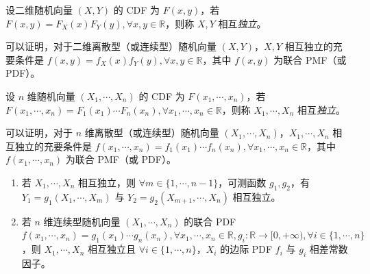 \documentclass[../main.tex]{subfiles}
\begin{document}
\begin{definition}\label{def:3.6.1}
    设二维随机向量 $(X,Y)$ 的 CDF 为 $F(x,y)$，若 $F(x,y)=F_X(x)F_Y(y),\forall x,y\in\mathbb R$，则称 $X,Y$ 相互\emph{独立}。
\end{definition}

可以证明，对于二维离散型（或连续型）随机向量 $(X,Y)$，$X,Y$ 相互独立的充要条件是 $f(x,y)=f_X(x)f_Y(y),\forall x,y\in\mathbb R$，其中 $f(x,y)$ 为联合 PMF（或 PDF）。

\begin{definition}\label{def:3.6.2}
    设 $n$ 维随机向量 $(X_1,\cdots,X_n)$ 的 CDF 为 $F(x_1,\cdots,x_n)$，若 $F(x_1,\cdots,x_n)=F_{1}(x_1)\cdots F_n(x_n),\forall x_1,\cdots,x_n\in\mathbb R$，则称 $X_1,\cdots,X_n$ 相互\emph{独立}。
\end{definition}

可以证明，对于 $n$ 维离散型（或连续型）随机向量 $(X_1,\cdots,X_n)$，$X_1,\cdots,X_n$ 相互独立的充要条件是 $f(x_1,\cdots,x_n)=f_1(x_1)\cdots f_n(x_n),\forall x_1,\cdots,x_n\in\mathbb R$，其中 $f(x_1,\cdots,x_n)$ 为联合 PMF（或 PDF）。

\begin{theorem}\label{thm:3.6.1}
    \begin{enumerate}
        \item 若 $X_1,\cdots,X_n$ 相互独立，则 $\forall m\in\{1,\cdots,n-1\}$，可测函数 $g_1,g_2$，有 $Y_1=g_1(X_1,\cdots,X_m)$ 与 $Y_2=g_2(X_{m+1},\cdots,X_n)$ 相互独立。
        \item 若 $n$ 维连续型随机向量 $(X_1,\cdots,X_n)$ 的联合 PDF $f(x_1,\cdots,x_n)=g_1(x_1)\cdots g_n(x_n),\forall x_1,\cdots,x_n\in\mathbb R,g_i:\mathbb R\rightarrow [0,+\infty),\forall i\in\{1,\cdots,n\}$，则 $X_1,\cdots,X_n$ 相互独立且 $\forall i\in\{1,\cdots,n\}$，$X_i$ 的边际 PDF $f_i$ 与 $g_i$ 相差常数因子。
    \end{enumerate}
\end{theorem}
\end{document}
